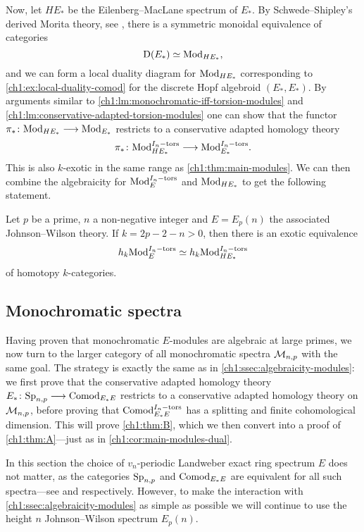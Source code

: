 Now, let $HE_*$ be the Eilenberg--MacLane spectrum of $E_*$. By Schwede--Shipley's derived Morita theory, see \cite[7.1.1.16]{Lurie_HA}, there is a symmetric monoidal equivalence of categories 
\[\mathrm{D}(E_*)\simeq \mathrm{Mod}_{HE_*},\] 
and we can form a local duality diagram for $\mathrm{Mod}_{HE_*}$ corresponding to \cref{ch1:ex:local-duality-comod} for the discrete Hopf algebroid $(E_*, E_*)$. By arguments similar to \cref{ch1:lm:monochromatic-iff-torsion-modules} and \cref{ch1:lm:conservative-adapted-torsion-modules} one can show that the functor $\pi_*\colon \mathrm{Mod}_{HE_*}\longrightarrow \mathrm{Mod}_{E_*}$ restricts to a conservative adapted homology theory 
\[\pi_* \colon \mathrm{Mod}_{HE_*}^{I_n-\mathrm{tors}}\longrightarrow \mathrm{Mod}_{E_*}^{I_n-\mathrm{tors}}.\]
This is also $k$-exotic in the same range as \cref{ch1:thm:main-modules}. We can then combine the algebraicity for $\mathrm{Mod}_{E}^{I_n-\mathrm{tors}}$ and $\mathrm{Mod}_{HE_*}$ to get the following statement. 

\begin{corollary}
    Let $p$ be a prime, $n$ a non-negative integer and $E = E_p(n)$ the associated Johnson--Wilson theory. If $k=2p-2-n>0$, then there is an exotic equivalence 
    \[h_k \mathrm{Mod}_{E}^{I_n-\mathrm{tors}} \simeq h_k \mathrm{Mod}_{HE_*}^{I_n-\mathrm{tors}}\]
    of homotopy $k$-categories. 
\end{corollary}



\subsection{Monochromatic spectra}
\label{ch1:ssec:algebraicity-spectra}

Having proven that monochromatic $E$-modules are algebraic at large primes, we now turn to the larger category of all monochromatic spectra $\mathcal{M}_{n,p}$ with the same goal. The strategy is exactly the same as in \cref{ch1:ssec:algebraicity-modules}: we first prove that the conservative adapted homology theory $E_*\colon \mathrm{Sp}_{n,p}\longrightarrow \mathrm{Comod}_{E_*E}$ restricts to a conservative adapted homology theory on $\mathcal{M}_{n,p}$, before proving that $\mathrm{Comod}_{E_*E}^{I_n-\mathrm{tors}}$ has a splitting and finite cohomological dimension. This will prove \cref{ch1:thm:B}, which we then convert into a proof of \cref{ch1:thm:A}---just as in \cref{ch1:cor:main-modules-dual}. 

In this section the choice of $v_n$-periodic Landweber exact ring spectrum $E$ does not matter, as the categories $\mathrm{Sp}_{n,p}$ and $\mathrm{Comod}_{E_*E}$ are equivalent for all such spectra---see \cite[1.12]{hovey_95} and \cite[4.2]{hovey-strickland_2005a} respectively. However, to make the interaction with \cref{ch1:ssec:algebraicity-modules} as simple as possible we will continue to use the height $n$ Johnson--Wilson spectrum $E_p(n)$.

